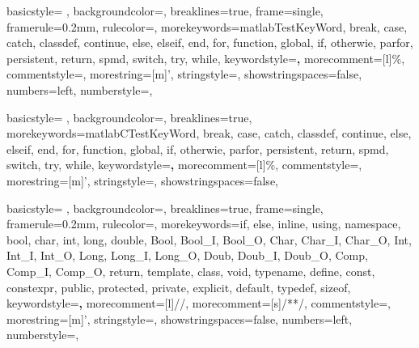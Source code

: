 {
    basicstyle= \ttfamily{}, %
    backgroundcolor=\color{background}, %
    breaklines=true, %
    frame=single,
    framerule=0.2mm, %
    rulecolor=\color{gray}, %
    morekeywords={matlabTestKeyWord, break, case, catch, classdef, continue, else, elseif, end, for, function, global, if, otherwie, parfor, persistent, return, spmd, switch, try, while},
    keywordstyle=\color{blue}\textbf,
    morecomment=[l]{\%},
    commentstyle=\color{comment},
    morestring=[m]',
    stringstyle=\color{string},
    showstringspaces=false,
    numbers=left,
    numberstyle={\ttfamily{}\color{gray}}, %
}

{
    basicstyle= \ttfamily{}, %
    backgroundcolor=\color{background}, %
    breaklines=true, %
    morekeywords={matlabCTestKeyWord, break, case, catch, classdef, continue, else, elseif, end, for, function, global, if, otherwie, parfor, persistent, return, spmd, switch, try, while},
    keywordstyle=\color{blue}\textbf,
    morecomment=[l]{\%},
    commentstyle=\color{comment},
    morestring=[m]',
    stringstyle=\color{string},
    showstringspaces=false,
}

{
    basicstyle= \ttfamily{}, %
    backgroundcolor=\color{background}, %
    breaklines=true, %
    frame=single,
    framerule=0.2mm, %
    rulecolor=\color{gray}, %
    morekeywords={if, else, inline, using, namespace, bool, char, int, long, double, Bool, Bool_I, Bool_O, Char, Char_I, Char_O, Int, Int_I, Int_O, Long, Long_I, Long_O, Doub, Doub_I, Doub_O, Comp, Comp_I, Comp_O, return, template, class, void, typename, define, const, constexpr, public, protected, private, explicit, default, typedef, sizeof},
    keywordstyle=\color{blue}\textbf,
    morecomment=[l]{//},
    morecomment=[s]{/*}{*/},
    commentstyle=\color{comment},
    morestring=[m]', %
    stringstyle=\color{string},
    showstringspaces=false,
    numbers=left,
    numberstyle={\ttfamily{}\color{gray}}, %
}


